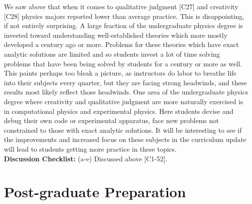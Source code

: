 \documentclass[12pt]{article}
\begin{document}
We saw above that when it comes to qualitative judgment [C27] and
creativity [C28] physics majors reported lower than average practice.
This is disappointing, if not entirely surprising.  A large
fraction of the undergraduate physics degree is invested toward
understanding well-established theories which more mostly developed a
century ago or more.  Problems for these theories which have exact
analytic solutions are limited and so students invest a lot of time
solving problems that have been being solved by students for a century
or more as well.  This paints perhaps too bleak a picture, as
instructors do labor to breathe life into their subjects every quarter,
but they are facing strong headwinds, and these results most likely
reflect those headwinds.  One area of the undergraduate physics degree
where creativity and qualitative judgment are more naturally exercised
is in computational physics and experimental physics.  Here students
devise and debug their own code or experimental apparatus, face new
problems not constrained to those with exact analytic solutions.  It
will be interesting to see if the improvements and increased focus on
these subjects in the curriculum update will lead to students getting
more practice in these topics.\\[3pt]

\noindent
{\bf Discussion Checklist:} (a-e) Discussed above [C1-52].

\newpage
\section{Post-graduate Preparation}

\end{document}
